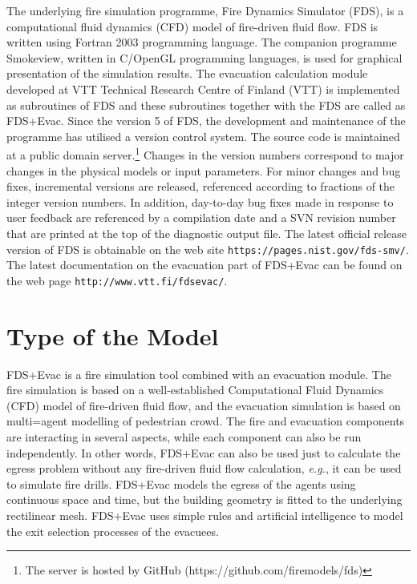 \documentclass[12pt,a4paper,final,twoside]{stylevk}
\begin{document}
\noindent The underlying fire simulation programme, Fire Dynamics
Simulator (FDS), is a computational fluid dynamics (CFD) model of
fire-driven fluid flow.  FDS is written using Fortran 2003 programming
language.  The companion programme Smokeview, written in C/OpenGL
programming languages, is used for graphical presentation of the
simulation results.  The evacuation calculation module developed at
VTT Technical Research Centre of Finland (VTT) is implemented as
subroutines of FDS and these subroutines together with the FDS are
called as FDS+Evac.  Since the version 5 of FDS, the development and
maintenance of the programme has utilised a version control system.
The source code is maintained at a public domain server.\footnote{The
  server is hosted by GitHub (https://github.com/firemodels/fds)}
Changes in the version numbers correspond to major changes in the
physical models or input parameters.  For minor changes and bug fixes,
incremental versions are released, referenced according to fractions
of the integer version numbers.  In addition, day-to-day bug fixes
made in response to user feedback are referenced by a compilation date
and a SVN revision number that are printed at the top of the
diagnostic output file.  The latest official release version of FDS is
obtainable on the web site {\tt https://pages.nist.gov/fds-smv/}.  The
latest documentation on the evacuation part of FDS+Evac can be found
on the web page {\tt http://www.vtt.fi/fdsevac/}.


\section{Type of the Model}

\noindent FDS+Evac is a fire simulation tool combined with an evacuation module.  
The fire simulation is based on a well-established Computational Fluid Dynamics 
(CFD) model of fire-driven fluid flow, and the evacuation simulation is based on multi=agent modelling of pedestrian crowd.  The fire and evacuation components are interacting in several aspects, while each component can also be run independently.  In other words, FDS+Evac can also be used just to calculate the egress problem without any fire-driven fluid flow calculation, \emph{e.g.}, it can be used to
simulate fire drills.  FDS+Evac models the egress of the agents using
continuous space and time, but the building geometry is fitted to the
underlying rectilinear mesh.  FDS+Evac uses simple rules and
artificial intelligence to model the exit selection processes of the
evacuees.
\end{document}
